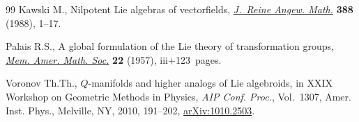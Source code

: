 \documentclass[11pt]{article}
\numberwithin{equation}{section}
\numberwithin{equation}{section}
\begin{document}
\begin{thebibliography}{99}
Kawski M., Nilpotent {L}ie algebras of vectorfields, \href{https://doi.org/10.1515/crll.1988.388.1}{\textit{J.~Reine Angew.
 Math.}} \textbf{388} (1988), 1--17.

Palais R.S., A global formulation of the {L}ie theory of transformation groups,
 \href{https://doi.org/10.1090/memo/0022}{\textit{Mem. Amer. Math. Soc.}} \textbf{22} (1957), iii+123~pages.

Voronov Th.Th., {$Q$}-manifolds and higher analogs of {L}ie algebroids, in X{XIX}
 {W}orkshop on {G}eometric {M}e\-thods in {P}hysics, \textit{AIP Conf. Proc.},
 Vol.~1307, Amer. Inst. Phys., Melville, NY, 2010, 191--202,
 \href{https://arxiv.org/abs/1010.2503}{arXiv:1010.2503}.

\end{thebibliography}
\end{document}
